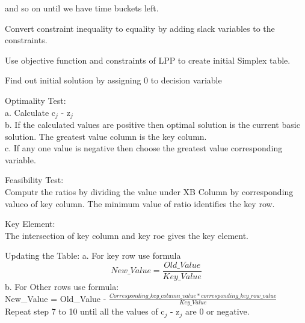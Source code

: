 \begin{algorithm}[H]
\begin{algorithmic}[1]
and so on until we have time buckets left.

\STATE Convert constraint inequality to equality by adding slack variables to the constraints.

\STATE Use objective function and constraints of LPP to create initial Simplex table.

\STATE Find out initial solution by assigning 0 to decision variable

\STATE Optimality Test: \\ 
\tab a. Calculate	c$_{j}$ - z$_{j}$  \\ 
\tab b. If the calculated values are positive then optimal solution is the current basic solution. The greatest value column is the key column.\\ 
\tab c. If any one value is negative then choose the greatest value corresponding variable.

\STATE Feasibility Test: \\
\tab Computr the ratios by dividing the value under XB Column by corresponding valueo of key column.  The minimum value of ratio identifies the key row. 

\STATE Key Element:\\
\tab The intersection of key column and key roe gives the key element.

\STATE Updating the Table:
\tab a. For key row use formula \begin{equation}
New\_Value = \frac{Old\_Value}{Key\_Value}
\end{equation}
\tab b. For Other rows use formula:\\

New\_Value = Old\_Value - $\frac{Corresponding\_key\_column\_value *  corresponding \_key\_row\_value}{Key\_Value}$ \\

\STATE Repeat step 7 to 10 until all the values of c$_{j}$ - z$_{j}$ are 0 or negative.

\end{algorithmic}

\end{algorithm}

